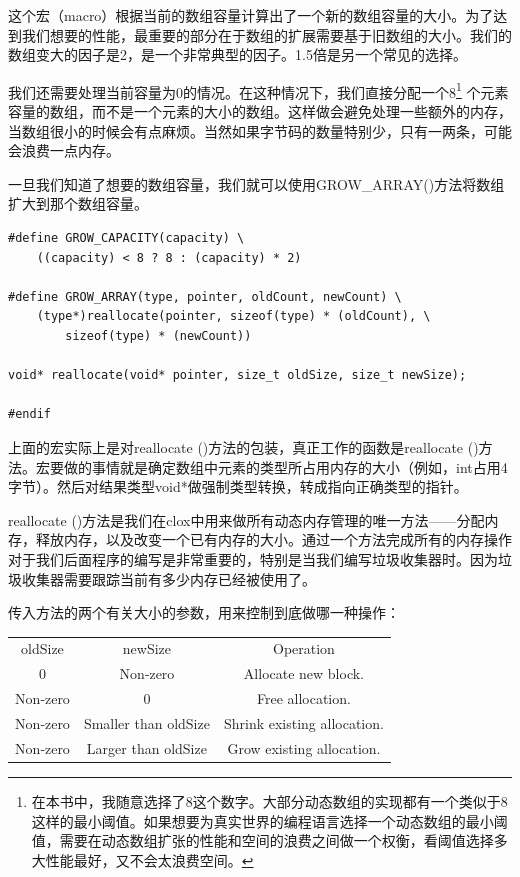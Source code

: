 \documentclass[cn,10pt,math=newtx,citestyle=gb7714-2015,bibstyle=gb7714-2015]{elegantbook}
\newenvironment{code}{\captionsetup{type=listing}}{}
\begin{document}
这个宏（macro）根据当前的数组容量计算出了一个新的数组容量的大小。为了达到我们想要的性能，最重要的部分在于数组的扩展需要基于旧数组的大小。我们的数组变大的因子是2，是一个非常典型的因子。1.5倍是另一个常见的选择。

我们还需要处理当前容量为0的情况。在这种情况下，我们直接分配一个8\footnote{在本书中，我随意选择了8这个数字。大部分动态数组的实现都有一个类似于8这样的最小阈值。如果想要为真实世界的编程语言选择一个动态数组的最小阈值，需要在动态数组扩张的性能和空间的浪费之间做一个权衡，看阈值选择多大性能最好，又不会太浪费空间。} 个元素容量的数组，而不是一个元素的大小的数组。这样做会避免处理一些额外的内存，当数组很小的时候会有点麻烦。当然如果字节码的数量特别少，只有一两条，可能会浪费一点内存。

一旦我们知道了想要的数组容量，我们就可以使用GROW\_ARRAY()方法将数组扩大到那个数组容量。

\begin{code}
\begin{verbatim}
#define GROW_CAPACITY(capacity) \
    ((capacity) < 8 ? 8 : (capacity) * 2)

#define GROW_ARRAY(type, pointer, oldCount, newCount) \
    (type*)reallocate(pointer, sizeof(type) * (oldCount), \
        sizeof(type) * (newCount))

void* reallocate(void* pointer, size_t oldSize, size_t newSize);

#endif
\end{verbatim}
\end{code}

上面的宏实际上是对reallocate ()方法的包装，真正工作的函数是reallocate ()方法。宏要做的事情就是确定数组中元素的类型所占用内存的大小（例如，int占用4字节）。然后对结果类型void*做强制类型转换，转成指向正确类型的指针。

reallocate ()方法是我们在clox中用来做所有动态内存管理的唯一方法——分配内存，释放内存，以及改变一个已有内存的大小。通过一个方法完成所有的内存操作对于我们后面程序的编写是非常重要的，特别是当我们编写垃圾收集器时。因为垃圾收集器需要跟踪当前有多少内存已经被使用了。

传入方法的两个有关大小的参数，用来控制到底做哪一种操作：

\begin{center}
\begin{tabular}{ |c|c|c| }
\hline
oldSize & newSize & Operation \\
0 & Non‑zero & Allocate new block. \\
Non‑zero & 0 & Free allocation. \\
Non‑zero & Smaller than oldSize & Shrink existing allocation. \\
Non‑zero & Larger than oldSize & Grow existing allocation. \\
\hline
\end{tabular}
\end{center}
\end{document}
